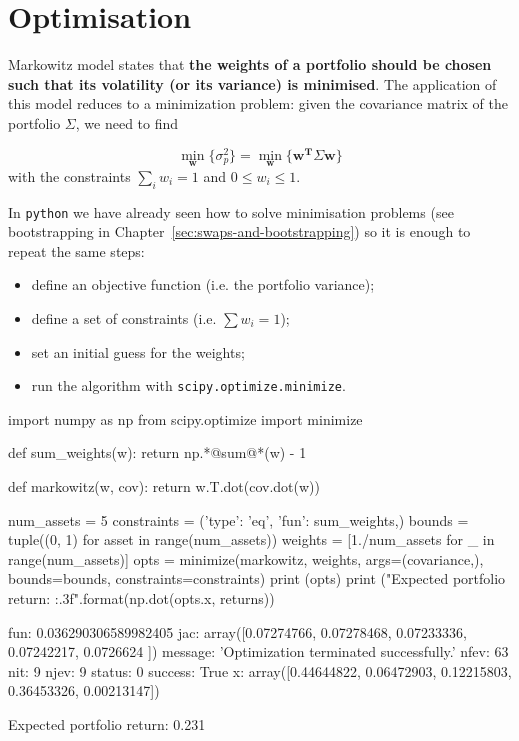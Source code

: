 \section{Optimisation}\label{optimization}

Markowitz model states that \textbf{the weights of a portfolio should be chosen such that its volatility (or its variance) is minimised}. 
The application of this model reduces to a minimization problem: given the covariance matrix of the portfolio $\Sigma$, we need to find

\begin{equation}
\underset{\mathbf{w}}{\min}\{\sigma_p^2\} = \underset{\mathbf{w}}{\min}\{\mathbf{w^T}\Sigma\mathbf{w}\}
\end{equation}
with the constraints \(\sum_{i}w_i = 1\) and \(0 \le w_i \le 1\).

In \texttt{python} we have already seen how to solve minimisation problems (see bootstrapping in Chapter~\ref{sec:swaps-and-bootstrapping}) so it is enough to repeat the same steps:

\begin{itemize}
\tightlist
\item define an objective function (i.e. the portfolio variance);
\item define a set of constraints (i.e. $\sum w_i = 1$);
\item set an initial guess for the weights;
\item run the algorithm with \texttt{scipy.optimize.minimize}.
\end{itemize}

\begin{ipython}
import numpy as np
from scipy.optimize import minimize

def sum_weights(w):
    return np.*@sum@*(w) - 1

def markowitz(w, cov):
    return w.T.dot(cov.dot(w))

num_assets = 5
constraints = ({'type': 'eq', 'fun': sum_weights},)
bounds = tuple((0, 1) for asset in range(num_assets))
weights = [1./num_assets for _ in range(num_assets)]
opts = minimize(markowitz, weights, args=(covariance,),
                bounds=bounds, constraints=constraints)
print (opts)
print ("Expected portfolio return: {:.3f}".format(np.dot(opts.x, returns))
\end{ipython}
\begin{ioutput}
    fun: 0.036290306589982405
    jac: array([0.07274766, 0.07278468, 0.07233336, 
                0.07242217, 0.0726624 ])
message: 'Optimization terminated successfully.'
   nfev: 63
    nit: 9
   njev: 9
 status: 0
success: True
x: array([0.44644822, 0.06472903, 0.12215803, 0.36453326, 0.00213147])

Expected portfolio return: 0.231
\end{ioutput}

